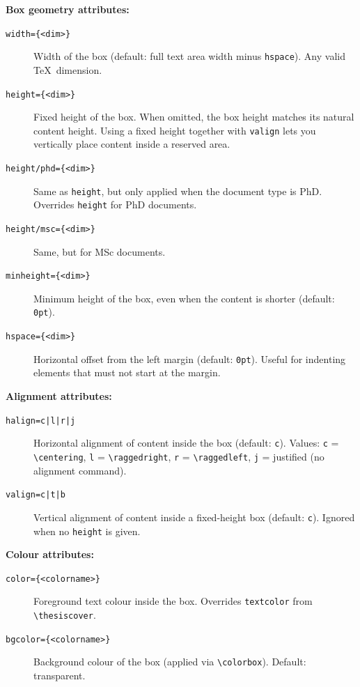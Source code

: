 \medskip
\noindent\textbf{Box geometry attributes:}

\begin{description}
  \item[\texttt{width=\{<dim>\}}] Width of the box (default: full text area
        width minus \texttt{hspace}).  Any valid \TeX\ dimension.
  \item[\texttt{height=\{<dim>\}}] Fixed height of the box.  When omitted, the
        box height matches its natural content height.  Using a fixed height
        together with \texttt{valign} lets you vertically place content inside
        a reserved area.
  \item[\texttt{height/phd=\{<dim>\}}] Same as \texttt{height}, but only
        applied when the document type is PhD.  Overrides \texttt{height} for
        PhD documents.
  \item[\texttt{height/msc=\{<dim>\}}] Same, but for MSc documents.
  \item[\texttt{minheight=\{<dim>\}}] Minimum height of the box, even when the
        content is shorter (default: \texttt{0pt}).
  \item[\texttt{hspace=\{<dim>\}}] Horizontal offset from the left margin
        (default: \texttt{0pt}).  Useful for indenting elements that must not
        start at the margin.
\end{description}

\medskip
\noindent\textbf{Alignment attributes:}

\begin{description}
  \item[\texttt{halign=c|l|r|j}] Horizontal alignment of content inside the
        box (default: \texttt{c}).  Values: \texttt{c} = \verb!\centering!,
        \texttt{l} = \verb!\raggedright!, \texttt{r} = \verb!\raggedleft!,
        \texttt{j} = justified (no alignment command).
  \item[\texttt{valign=c|t|b}] Vertical alignment of content inside a
        fixed-height box (default: \texttt{c}).  Ignored when no \texttt{height}
        is given.
\end{description}

\medskip
\noindent\textbf{Colour attributes:}

\begin{description}
  \item[\texttt{color=\{<colorname>\}}] Foreground text colour inside the box.
        Overrides \texttt{textcolor} from \verb!\thesiscover!.
  \item[\texttt{bgcolor=\{<colorname>\}}] Background colour of the box
        (applied via \verb!\colorbox!).  Default: transparent.
\end{description}

